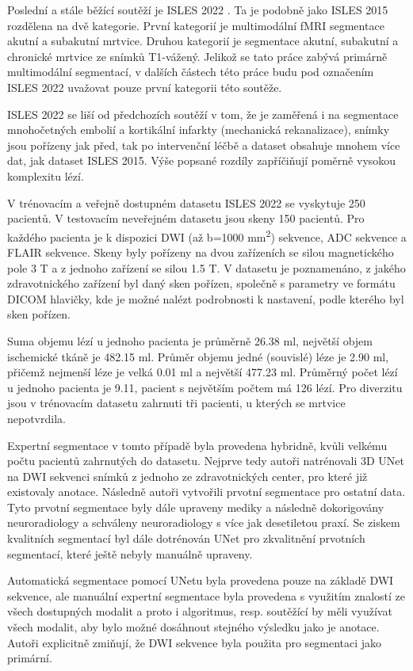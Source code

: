 \documentclass[11pt]{article}
\begin{document}
Poslední a stále běžící soutěží je ISLES 2022 \cite{isles2022}. Ta je podobně jako ISLES 2015 rozdělena na dvě kategorie. První kategorií je multimodální fMRI segmentace akutní a subakutní mrtvice. Druhou kategorií je segmentace akutní, subakutní a chronické mrtvice ze snímků T1-vážený. Jelikož se tato práce zabývá primárně multimodální segmentací, v dalších částech této práce budu pod označením ISLES 2022 uvažovat pouze první kategorii této soutěže.

ISLES 2022 se liší od předchozích soutěží v tom, že je zaměřená i na segmentace \alert{mnohočetných embolií a kortikální infarkty (mechanická rekanalizace)}, snímky jsou pořízeny jak před, tak po intervenční léčbě a dataset obsahuje mnohem více dat, jak dataset ISLES 2015. Výše popsané rozdíly zapříčiňují poměrně vysokou komplexitu lézí.

V trénovacím a veřejně dostupném datasetu ISLES 2022 se vyskytuje 250 pacientů. V testovacím neveřejném datasetu jsou skeny 150 pacientů. Pro každého pacienta je k dispozici DWI (až b=1000 mm\textsuperscript{2}) sekvence, ADC sekvence a FLAIR sekvence. Skeny byly pořízeny na dvou zařízeních se silou magnetického pole 3 T a z jednoho zařízení se silou 1.5 T. V datasetu je poznamenáno, z jakého zdravotnického zařízení byl daný sken pořízen, společně s parametry ve formátu DICOM hlavičky, kde je možné nalézt podrobnosti k nastavení, podle kterého byl sken pořízen.

Suma objemu lézí u jednoho pacienta je průměrně 26.38 ml, největší objem ischemické tkáně je 482.15 ml. Průměr objemu jedné (souvislé) léze je 2.90 ml, přičemž nejmenší léze je velká 0.01 ml a největší 477.23 ml. Průměrný počet lézí u jednoho pacienta je 9.11, pacient s největším počtem má 126 lézí. Pro diverzitu jsou v trénovacím datasetu zahrnuti tři pacienti, u kterých se mrtvice nepotvrdila.

Expertní segmentace v tomto případě byla provedena hybridně, kvůli velkému počtu pacientů zahrnutých do datasetu. Nejprve tedy autoři natrénovali 3D UNet \cite{3DUnet} na DWI sekvenci snímků z jednoho ze zdravotnických center, pro které již existovaly anotace. Následně autoři vytvořili prvotní segmentace pro ostatní data. Tyto prvotní segmentace byly dále upraveny mediky a následně dokorigovány neuroradiology a schváleny neuroradiology s více jak desetiletou praxí. Se ziskem kvalitních segmentací byl dále dotrénován UNet pro zkvalitnění prvotních segmentací, které ještě nebyly manuálně upraveny.

Automatická segmentace pomocí UNetu byla provedena pouze na základě DWI sekvence, ale manuální expertní segmentace byla provedena s využitím znalostí ze všech dostupných modalit a proto i algoritmus, resp. soutěžící by měli využívat všech modalit, aby bylo možné dosáhnout stejného výsledku jako je anotace. Autoři explicitně zmiňují, že DWI sekvence byla použita pro segmentaci jako primární.
\end{document}
